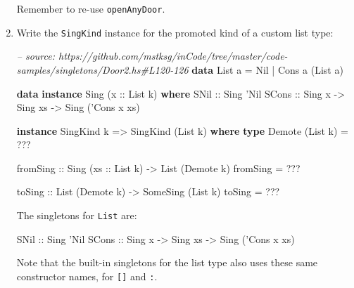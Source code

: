 \documentclass[]{article}
\newenvironment{Shaded}{}{}
\newcommand{\KeywordTok}[1]{\textcolor[rgb]{0.00,0.44,0.13}{\textbf{#1}}}
\newcommand{\DataTypeTok}[1]{\textcolor[rgb]{0.56,0.13,0.00}{#1}}
\newcommand{\CharTok}[1]{\textcolor[rgb]{0.25,0.44,0.63}{#1}}
\newcommand{\CommentTok}[1]{\textcolor[rgb]{0.38,0.63,0.69}{\textit{#1}}}
\newcommand{\OtherTok}[1]{\textcolor[rgb]{0.00,0.44,0.13}{#1}}
\newcommand{\FunctionTok}[1]{\textcolor[rgb]{0.02,0.16,0.49}{#1}}
\newcommand{\NormalTok}[1]{#1}
\begin{document}
\begin{enumerate}
  Remember to re-use \texttt{openAnyDoor}.
\item
  Write the \texttt{SingKind} instance for the promoted kind of a custom list
  type:

\begin{Shaded}
\begin{Highlighting}[]
\CommentTok{-- source: https://github.com/mstksg/inCode/tree/master/code-samples/singletons/Door2.hs#L120-126}
\KeywordTok{data} \DataTypeTok{List}\NormalTok{ a }\FunctionTok{=} \DataTypeTok{Nil} \FunctionTok{|} \DataTypeTok{Cons}\NormalTok{ a (}\DataTypeTok{List}\NormalTok{ a)}

\KeywordTok{data} \KeywordTok{instance} \DataTypeTok{Sing}\NormalTok{ (}\OtherTok{x ::} \DataTypeTok{List}\NormalTok{ k) }\KeywordTok{where}
    \DataTypeTok{SNil}\OtherTok{  ::} \DataTypeTok{Sing} \CharTok{'Nil}
    \DataTypeTok{SCons}\OtherTok{ ::} \DataTypeTok{Sing}\NormalTok{ x }\OtherTok{->} \DataTypeTok{Sing}\NormalTok{ xs }\OtherTok{->} \DataTypeTok{Sing}\NormalTok{ (}\CharTok{'Cons x xs)}

\KeywordTok{instance} \DataTypeTok{SingKind}\NormalTok{ k }\OtherTok{=>} \DataTypeTok{SingKind}\NormalTok{ (}\DataTypeTok{List}\NormalTok{ k) }\KeywordTok{where}
    \KeywordTok{type} \DataTypeTok{Demote}\NormalTok{ (}\DataTypeTok{List}\NormalTok{ k) }\FunctionTok{=} \FunctionTok{???}

\OtherTok{    fromSing ::} \DataTypeTok{Sing}\NormalTok{ (}\OtherTok{xs ::} \DataTypeTok{List}\NormalTok{ k) }\OtherTok{->} \DataTypeTok{List}\NormalTok{ (}\DataTypeTok{Demote}\NormalTok{ k)}
\NormalTok{    fromSing }\FunctionTok{=} \FunctionTok{???}

\OtherTok{    toSing ::} \DataTypeTok{List}\NormalTok{ (}\DataTypeTok{Demote}\NormalTok{ k) }\OtherTok{->} \DataTypeTok{SomeSing}\NormalTok{ (}\DataTypeTok{List}\NormalTok{ k)}
\NormalTok{    toSing }\FunctionTok{=} \FunctionTok{???}
\end{Highlighting}
\end{Shaded}

  The singletons for \texttt{List} are:

\begin{Shaded}
\begin{Highlighting}[]
\DataTypeTok{SNil}\OtherTok{  ::} \DataTypeTok{Sing} \CharTok{'Nil}
\DataTypeTok{SCons}\OtherTok{ ::} \DataTypeTok{Sing}\NormalTok{ x }\OtherTok{->} \DataTypeTok{Sing}\NormalTok{ xs }\OtherTok{->} \DataTypeTok{Sing}\NormalTok{ (}\CharTok{'Cons x xs)}
\end{Highlighting}
\end{Shaded}

  Note that the built-in singletons for the list type also uses these same
  constructor names, for \texttt{{[}{]}} and \texttt{:}.
\end{enumerate}
\end{document}
